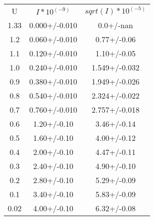 \begin{table}
\begin{tabular}{ccc}
U & $I*10^(-9)$ & $sqrt(I)*10^(-5)$ \\
1.33 & 0.000+/-0.010 & 0.0+/-nan \\
1.2 & 0.060+/-0.010 & 0.77+/-0.06 \\
1.1 & 0.120+/-0.010 & 1.10+/-0.05 \\
1.0 & 0.240+/-0.010 & 1.549+/-0.032 \\
0.9 & 0.380+/-0.010 & 1.949+/-0.026 \\
0.8 & 0.540+/-0.010 & 2.324+/-0.022 \\
0.7 & 0.760+/-0.010 & 2.757+/-0.018 \\
0.6 & 1.20+/-0.10 & 3.46+/-0.14 \\
0.5 & 1.60+/-0.10 & 4.00+/-0.12 \\
0.4 & 2.00+/-0.10 & 4.47+/-0.11 \\
0.3 & 2.40+/-0.10 & 4.90+/-0.10 \\
0.2 & 2.80+/-0.10 & 5.29+/-0.09 \\
0.1 & 3.40+/-0.10 & 5.83+/-0.09 \\
0.02 & 4.00+/-0.10 & 6.32+/-0.08 \\
\end{tabular}
\end{table}
